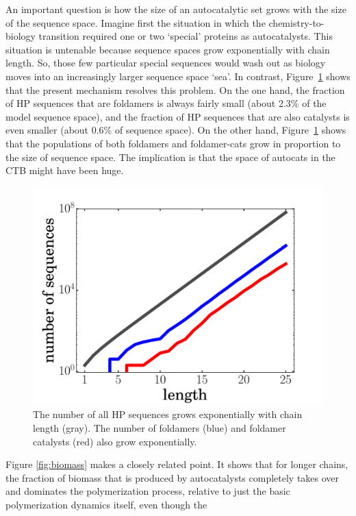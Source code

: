 \documentclass[5p,times]{elsarticle}
\begin{document}
 An important question is how the size of an autocatalytic set grows with the size of the sequence 
space.  Imagine first the situation in which the chemistry-to-biology transition required one or 
two `special' proteins as autocatalysts.  This situation is untenable because sequence spaces grow 
exponentially with chain length.  So, those few particular special sequences would wash out as 
biology moves into an increasingly larger sequence space `sea'.  In contrast, 
Figure~\ref{fig:hp-statistics} shows that the present mechanism resolves this problem.  On the one 
hand, the fraction of HP sequences that are foldamers is always fairly small (about 2.3\% of the 
model sequence space), and the fraction of HP sequences that are also catalysts is even smaller 
(about 0.6\% of sequence space).  On the other hand, Figure~\ref{fig:hp-statistics} shows that the 
populations of both foldamers and foldamer-cats grow in proportion to the size of sequence space.  
The implication is that the space of autocats in the CTB might have been huge.
\begin{figure}[hbt!]
  \centering
  \includegraphics[width=0.9\columnwidth]{pictures/hp-statistics.pdf} 
  \caption{\footnotesize{The number of all HP sequences grows exponentially with chain 
length (gray).  The number of foldamers (blue) and foldamer catalysts (red) also grow 
exponentially.}}
  \label{fig:hp-statistics}
\end{figure}
 Figure \ref{fig:biomass} makes a closely related point.  It shows that for longer chains, the 
fraction of biomass that is produced by autocatalysts completely takes over and dominates the 
polymerization process, relative to just the basic polymerization dynamics itself, even though the 
\end{document}
